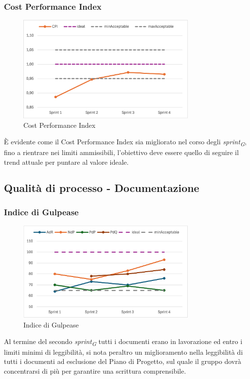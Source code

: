 \subsubsection{Cost Performance Index}
\begin{figure}[H]
    \centering
    \includegraphics[width=0.8\textwidth]{./images/CPI.png}
    \caption{Cost Performance Index}
\end{figure}
È evidente come il Cost Performance Index sia migliorato nel corso degli \textit{sprint\textsubscript{G}}, fino a rientrare nei limiti ammissibili, l'obiettivo deve essere quello di seguire il trend attuale per puntare al valore ideale.

\subsection{Qualità di processo - Documentazione}
\subsubsection{Indice di Gulpease}
\begin{figure}[H]
    \centering
    \includegraphics[width=0.8\textwidth]{./images/gulpease.png}
    \caption{Indice di Gulpease}
\end{figure}
Al termine del secondo \textit{sprint\textsubscript{G}} tutti i documenti erano in lavorazione ed entro i limiti minimi di leggibilità, si nota peraltro un miglioramento nella leggibilità di tutti i documenti ad esclusione del Piano di Progetto, sul quale il gruppo dovrà concentrarsi di più per garantire una scrittura comprensibile.

